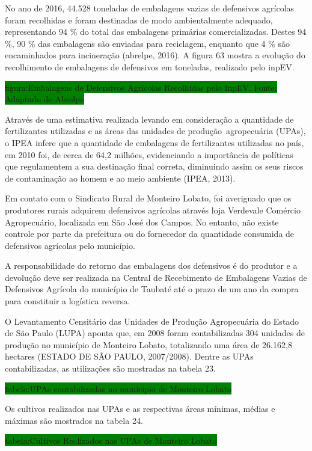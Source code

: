 	No ano de 2016, 44.528 toneladas de embalagens vazias de defensivos agrícolas foram recolhidas e foram destinadas de modo ambientalmente adequado, representando 94 \% do total das embalagens primárias comercializadas. Destes 94 \%, 90 \% das embalagens são enviadas para reciclagem, enquanto que 4 \% são encaminhados para incineração (\gls{abrelpe}, 2016). A figura 63 mostra a evolução do recolhimento de embalagens de defensivos em toneladas, realizado pelo inpEV.
	
	\colorbox{green}{figura:Embalagens de Defensivos Agrícolas Recolhidas pelo InpEV. Fonte: Adaptado de Abrelpe}
	
	Através de uma estimativa realizada levando em consideração a quantidade de fertilizantes utilizadas e as áreas das unidades de produção agropecuária (UPAs), o IPEA infere que a quantidade de embalagens de fertilizantes utilizadas no país, em 2010 foi, de cerca de 64,2 milhões, evidenciando a importância de políticas que regulamentem a sua destinação final correta, diminuindo assim os seus riscos de contaminação ao homem e ao meio ambiente (IPEA, 2013).
	
	Em contato com o Sindicato Rural de Monteiro Lobato, foi averiguado que os produtores rurais adquirem defensivos agrícolas através loja Verdevale Comércio Agropecuário, localizada em São José dos Campos. No entanto, não existe controle por parte da prefeitura ou do fornecedor da quantidade consumida de defensivos agrícolas pelo município. 
	
	A responsabilidade do retorno das embalagens dos defensivos é do produtor e a devolução deve ser realizada na Central de Recebimento de Embalagens Vazias de Defensivos Agrícola do município de Taubaté até o prazo de um ano da compra para constituir a logística reversa.
	
	O Levantamento Censitário das Unidades de Produção Agropecuária do Estado de São Paulo (LUPA) aponta que, em 2008 foram contabilizadas 304 unidades de produção no município de Monteiro Lobato, totalizando uma área de 26.162,8 hectares (ESTADO DE SÃO PAULO, 2007/2008). Dentre as UPAs contabilizadas, as utilizações são mostradas na tabela 23.
	
	\colorbox{green}{tabela:UPAs contabilizadas no município de Monteiro Lobato}

	Os cultivos realizados nas UPAs e as respectivas áreas mínimas, médias e máximas são mostrados na tabela 24.
	
	\colorbox{green}{tabela:Cultivos Realizados nas UPAs de Monteiro Lobato}
	
